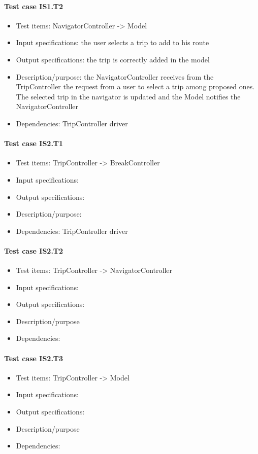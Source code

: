\documentclass[a4paper,leqno]{article}
\begin{document}
\paragraph{Test case IS1.T2}
\begin{itemize}
	\item Test items: NavigatorController -> Model
	\item Input specifications: the user selects a trip to add to his route
	\item Output specifications: the trip is correctly added in the model
	\item Description/purpose: the NavigatorController receives from the TripController the request from a user to select a trip among proposed ones. The selected trip in the navigator is updated and the Model notifies the NavigatorController
	\item Dependencies: TripController driver
\end{itemize}

\paragraph{Test case IS2.T1}
\begin{itemize}
	\item Test items: TripController -> BreakController
	\item Input specifications:
	\item Output specifications:
	\item Description/purpose:
	\item Dependencies: TripController driver
\end{itemize}

\paragraph{Test case IS2.T2}
\begin{itemize}
	\item Test items: TripController -> NavigatorController
	\item Input specifications:
	\item Output specifications:
	\item Description/purpose
	\item Dependencies:
\end{itemize}

\paragraph{Test case IS2.T3}
\begin{itemize}
	\item Test items: TripController -> Model
	\item Input specifications: 
	\item Output specifications: 
	\item Description/purpose
	\item Dependencies:
\end{itemize}
\end{document}
